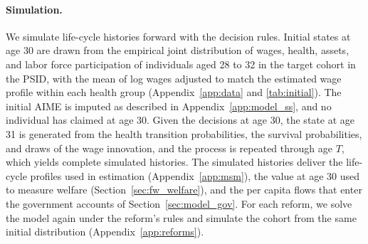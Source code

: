 \paragraph{Simulation.} We simulate life-cycle histories forward with the decision rules. Initial states at age 30 are drawn from the empirical joint distribution of wages, health, assets, and labor force participation of individuals aged 28 to 32 in the target cohort in the PSID, %
 with the mean of log wages adjusted to match the estimated wage profile within each health group (Appendix~\ref{app:data} and \autoref{tab:initial}). The initial AIME is imputed as described in Appendix~\ref{app:model_ss}, and no individual has claimed at age 30. Given the decisions at age 30, the state at age 31 is generated from the health transition probabilities, the survival probabilities, and draws of the wage innovation, and the process is repeated through age $T$, which yields complete simulated histories. The simulated histories deliver the life-cycle profiles used in estimation (Appendix~\ref{app:msm}), the value at age 30 used to measure welfare (Section~\ref{sec:fw_welfare}), and the per capita flows that enter the government accounts of Section~\ref{sec:model_gov}. For each reform, we solve the model again under the reform's rules and simulate the cohort from the same initial distribution (Appendix~\ref{app:reforms}).
